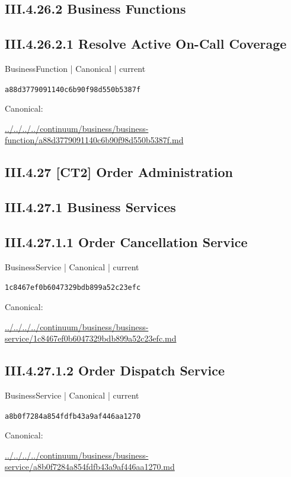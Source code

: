 \documentclass[10pt,a4paper]{article}
\begin{document}
\subsection*{III.4.26.2 Business Functions}
\subsection*{III.4.26.2.1 Resolve Active On-Call Coverage}
{\small BusinessFunction | Canonical | current}\par
\texttt{a88d3779091140c6b90f98d550b5387f}\par
Canonical: \par
{\footnotesize\url{../../../../continuum/business/business-function/a88d3779091140c6b90f98d550b5387f.md}}\par
\subsection*{III.4.27 [CT2] Order Administration}
\subsection*{III.4.27.1 Business Services}
\subsection*{III.4.27.1.1 Order Cancellation Service}
{\small BusinessService | Canonical | current}\par
\texttt{1c8467ef0b6047329bdb899a52c23efc}\par
Canonical: \par
{\footnotesize\url{../../../../continuum/business/business-service/1c8467ef0b6047329bdb899a52c23efc.md}}\par
\subsection*{III.4.27.1.2 Order Dispatch Service}
{\small BusinessService | Canonical | current}\par
\texttt{a8b0f7284a854fdfb43a9af446aa1270}\par
Canonical: \par
{\footnotesize\url{../../../../continuum/business/business-service/a8b0f7284a854fdfb43a9af446aa1270.md}}\par
\end{document}
